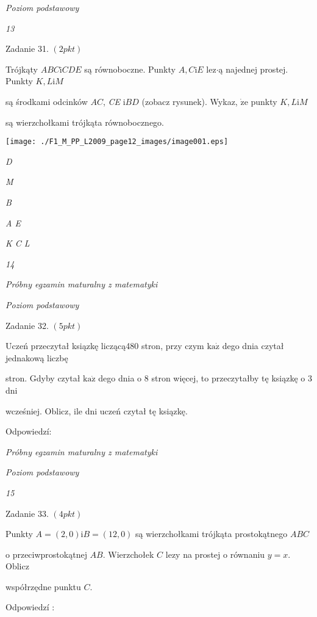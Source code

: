 \documentclass[a4paper,12pt]{article}
\begin{document}
{\it Poziom podstawowy}

{\it 13}

Zadanie 31. $(2pkt)$

Trójkąty $ABC\mathrm{i}CDE$ są równoboczne. Punkty $A, C\mathrm{i}E$ lez$\cdot$ą najednej prostej. Punkty $K, L\mathrm{i}M$

są środkami odcinków $AC$, {\it CE} $\mathrm{i} BD$ (zobacz rysunek). Wykaz, $\dot{\mathrm{z}}\mathrm{e}$ punkty $K, L \mathrm{i} M$

są wierzchołkami trójkąta równobocznego.
\begin{center}
\texttt{[image: ./F1\_M\_PP\_L2009\_page12\_images/image001.eps]}
\end{center}
{\it D}

{\it M}

{\it B}

{\it A  E}

{\it K C  L}





{\it 14}

{\it Próbny egzamin maturalny z matematyki}

{\it Poziom podstawowy}

Zadanie 32. $(5pkt)$

Uczeń przeczytał ksiązkę liczącą480 stron, przy czym $\mathrm{k}\mathrm{a}\dot{\mathrm{z}}$ dego dnia czytał jednakową liczbę

stron. Gdyby czytał $\mathrm{k}\mathrm{a}\dot{\mathrm{z}}$ dego dnia o 8 stron więcej, to przeczytałby tę ksiązkę o 3 dni

wcześniej. Oblicz, ile dni uczeń czytał tę ksiązkę.

Odpowiedzí:





{\it Próbny egzamin maturalny z matematyki}

{\it Poziom podstawowy}

{\it 15}

Zadanie 33. $(4pkt)$

Punkty $A=(2,0) \mathrm{i} B=(12,0)$ są wierzchołkami trójkąta prostokątnego $ABC$

o przeciwprostokątnej $AB$. Wierzchołek $C$ lezy na prostej o równaniu $y=x$. Oblicz

współrzędne punktu $C.$

Odpowiedzí :
\end{document}
